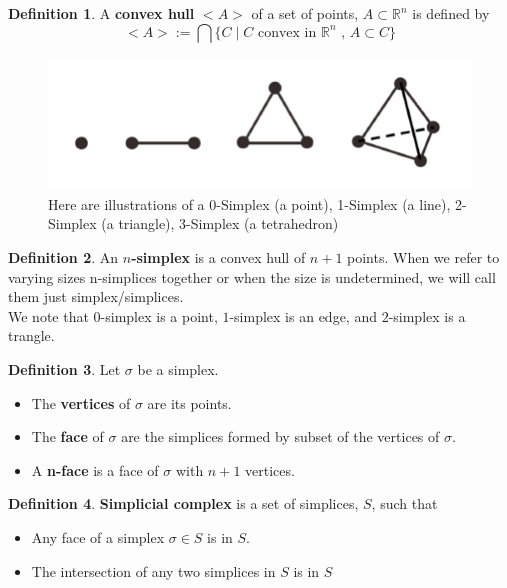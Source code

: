 \documentclass[12pt, a4paper, twocolumn, fullpage]{article}
\theoremstyle{plain}
\theoremstyle{definition}
\newtheorem{defn}{Definition}[section]
\theoremstyle{remark}
\begin{document}
\begin{defn}
A \textbf{convex hull} $<A>$ of a set of points, $A \subset \mathbb{R}^n$ is defined by 
$$<A> := \bigcap \{C \mid C \text{ convex in } \mathbb{R}^n \text{ , } A\subset C \} $$
\end{defn}

\begin{figure}[t]
    \includegraphics[width=\linewidth]{img/mathDef/simplex.png}
    \caption{Here are illustrations of a 0-Simplex (a point), 1-Simplex (a line), 2-Simplex (a triangle), 3-Simplex (a tetrahedron)}
    \label{Simplex}
\end{figure}

\begin{defn}
An \textbf{$n$-simplex} is a convex hull of $n+1$ points. When we refer to varying sizes n-simplices together or when the size is undetermined, we will call them just simplex/simplices.\\
We note that $0$-simplex is a point, $1$-simplex is an edge, and $2$-simplex is a trangle.
\end{defn}

\begin{defn}
Let $\sigma$ be a simplex.
\begin{itemize}
\item The \textbf{vertices} of $\sigma$ are its points.
\item The \textbf{face} of $\sigma$ are the simplices formed by subset of the vertices of $\sigma$.
\item A  \textbf{n-face} is a face of $\sigma$ with $n+1$ vertices.
\end{itemize}
\end{defn}

\begin{defn}
\textbf{Simplicial complex} is a set of simplices, $S $, such that 
\begin{itemize}
    \item Any face of a simplex $\sigma \in S$ is in $S$.
    \item The intersection of any two simplices in $ S $ is in $ S $
\end{itemize}
\end{defn}
\end{document}
